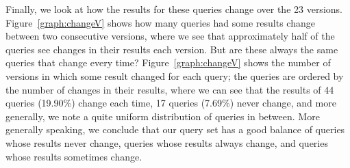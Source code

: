 \documentclass[runningheads]{llncs}
\begin{document}
Finally, we look at how the results for these queries change over the 23 versions. Figure~\ref{graph:changeV} shows how many queries had some results change between two consecutive versions, where we see that approximately half of the queries see changes in their results each version. But are these always the same queries that change every time? Figure~\ref{graph:changeV} shows the number of versions in which some result changed for each query; the queries are ordered by the number of changes in their results, where we can see that the results of 44 queries (19.90\%) change each time, 17 queries (7.69\%) never change, and more generally, we note a quite uniform distribution of queries in between. More generally speaking, we conclude that our query set has a good balance of queries whose results never change, queries whose results always change, and queries whose results sometimes change.
\end{document}
